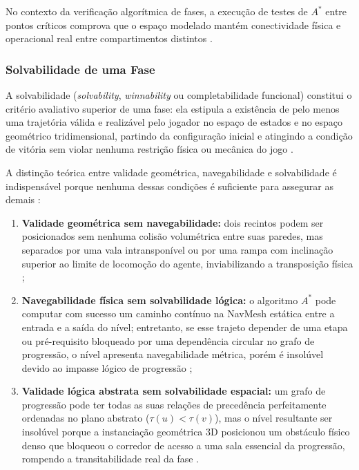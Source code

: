 No contexto da verificação algorítmica de fases, a execução de testes de $A^*$ entre pontos críticos comprova que o espaço modelado mantém conectividade física e operacional real entre compartimentos distintos \cite{xu2025databasedrivenframework3dlevel}.

\subsubsection{Solvabilidade de uma Fase}
\label{sec:solvabilidade}

A solvabilidade (\textit{solvability}, \textit{winnability} ou completabilidade funcional) constitui o critério avaliativo superior de uma fase: ela estipula a existência de pelo menos uma trajetória válida e realizável pelo jogador no espaço de estados e no espaço geométrico tridimensional, partindo da configuração inicial e atingindo a condição de vitória sem violar nenhuma restrição física ou mecânica do jogo \cite{tanagra, dormans2010, linden2014dungeons, summerville2018procedural, nasir2024word2worldgeneratingstoriesworlds, xu2025constraint}.

A distinção teórica entre validade geométrica, navegabilidade e solvabilidade é indispensável porque nenhuma dessas condições é suficiente para assegurar as demais \cite{dormans2010, linden2014dungeons, summerville2018procedural, xu2025constraint}:
\begin{enumerate}
    \item \textbf{Validade geométrica sem navegabilidade:} dois recintos podem ser posicionados sem nenhuma colisão volumétrica entre suas paredes, mas separados por uma vala intransponível ou por uma rampa com inclinação superior ao limite de locomoção do agente, inviabilizando a transposição física \cite{xu2025databasedrivenframework3dlevel};
    \item \textbf{Navegabilidade física sem solvabilidade lógica:} o algoritmo $A^*$ pode computar com sucesso um caminho contínuo na NavMesh estática entre a entrada e a saída do nível; entretanto, se esse trajeto depender de uma etapa ou pré-requisito bloqueado por uma dependência circular no grafo de progressão, o nível apresenta navegabilidade métrica, porém é insolúvel devido ao impasse lógico de progressão \cite{dormans2010, linden2013designing};
    \item \textbf{Validade lógica abstrata sem solvabilidade espacial:} um grafo de progressão pode ter todas as suas relações de precedência perfeitamente ordenadas no plano abstrato ($\tau(u) < \tau(v)$), mas o nível resultante ser insolúvel porque a instanciação geométrica 3D posicionou um obstáculo físico denso que bloqueou o corredor de acesso a uma sala essencial da progressão, rompendo a transitabilidade real da fase \cite{linden2014dungeons, xu2025databasedrivenframework3dlevel}.
\end{enumerate}

